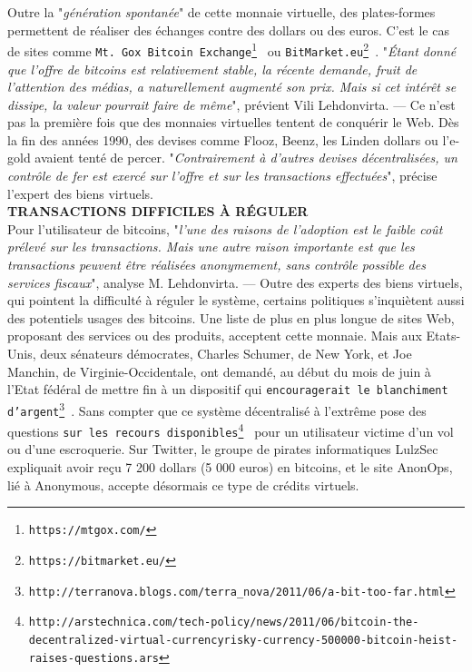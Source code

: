 \documentclass[11pt,twoside,a4paper]{article}
\begin{document}
Outre la "\emph{g{\'e}n{\'e}ration spontan{\'e}e}" de cette monnaie virtuelle, des plates-formes permettent de r{\'e}aliser des {\'e}changes contre des dollars ou des euros. C'est le cas de sites comme \texttt{Mt. Gox Bitcoin Exchange\footnote{\texttt{https://mtgox.com/}} } ou \texttt{BitMarket.eu\footnote{\texttt{https://bitmarket.eu/}} }. "\emph{{\'E}tant donn{\'e} que l'offre de bitcoins est relativement stable, la r{\'e}cente demande, fruit de l'attention des m{\'e}dias, a naturellement augment{\'e} son prix. Mais si cet int{\'e}r{\^e}t se dissipe, la valeur pourrait faire de m{\^e}me}", pr{\'e}vient Vili Lehdonvirta. --- Ce n'est pas la premi{\`e}re fois que des monnaies virtuelles tentent de conqu{\'e}rir le Web. D{\`e}s la fin des ann{\'e}es 1990, des devises comme Flooz, Beenz, les Linden dollars ou l'e-gold avaient tent{\'e} de percer. "\emph{Contrairement {\`a} d'autres devises d{\'e}centralis{\'e}es, un contr{\^o}le de fer est exerc{\'e} sur l'offre et sur les transactions effectu{\'e}es}", pr{\'e}cise l'expert des biens virtuels. ~\\

\textbf{\textsc{TRANSACTIONS DIFFICILES {\`A} R{\'E}GULER}}~\\

Pour l'utilisateur de bitcoins, "\emph{l'une des raisons de l'adoption est le faible co{\^u}t pr{\'e}lev{\'e} sur les transactions. Mais une autre raison importante est que les transactions peuvent {\^e}tre r{\'e}alis{\'e}es anonymement, sans contr{\^o}le possible des services fiscaux}", analyse M. Lehdonvirta. --- Outre des experts des biens virtuels, qui pointent la difficult{\'e} {\`a} r{\'e}guler le syst{\`e}me, certains politiques s'inqui{\`e}tent aussi des potentiels usages des bitcoins. Une liste de plus en plus longue de sites Web, proposant des services ou des produits, acceptent cette monnaie. Mais aux Etats-Unis, deux s{\'e}nateurs d{\'e}mocrates, Charles Schumer, de New York, et Joe Manchin, de Virginie-Occidentale, ont demand{\'e}, au d{\'e}but du mois de juin {\`a} l'Etat f{\'e}d{\'e}ral de mettre fin {\`a} un dispositif qui \texttt{encouragerait le blanchiment d'argent\footnote{\texttt{http://terranova.blogs.com/terra\_nova/2011/06/a-bit-too-far.html}} }. Sans compter que ce syst{\`e}me d{\'e}centralis{\'e} {\`a} l'extr{\^e}me pose des questions \texttt{sur les recours disponibles\footnote{\texttt{http://arstechnica.com/tech-policy/news/2011/06/bitcoin-the-decentralized-virtual-currencyrisky-currency-500000-bitcoin-heist-raises-questions.ars}} } pour un utilisateur victime d'un vol ou d'une escroquerie. Sur Twitter, le groupe de pirates informatiques LulzSec expliquait avoir re\c{c}u 7 200 dollars (5 000 euros) en bitcoins, et le site AnonOps, li{\'e} {\`a} Anonymous, accepte d{\'e}sormais ce type de cr{\'e}dits virtuels. ~\\
\end{document}
